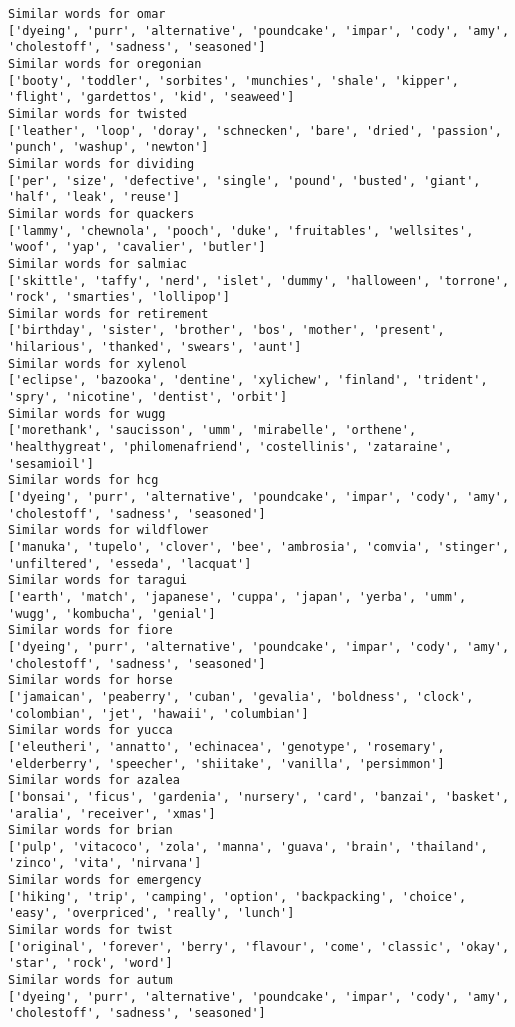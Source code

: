 \documentclass[11pt]{article}
\begin{document}
\begin{Verbatim}[commandchars=\\\{\}]
Similar words for omar
['dyeing', 'purr', 'alternative', 'poundcake', 'impar', 'cody', 'amy', 'cholestoff', 'sadness', 'seasoned']
Similar words for oregonian
['booty', 'toddler', 'sorbites', 'munchies', 'shale', 'kipper', 'flight', 'gardettos', 'kid', 'seaweed']
Similar words for twisted
['leather', 'loop', 'doray', 'schnecken', 'bare', 'dried', 'passion', 'punch', 'washup', 'newton']
Similar words for dividing
['per', 'size', 'defective', 'single', 'pound', 'busted', 'giant', 'half', 'leak', 'reuse']
Similar words for quackers
['lammy', 'chewnola', 'pooch', 'duke', 'fruitables', 'wellsites', 'woof', 'yap', 'cavalier', 'butler']
Similar words for salmiac
['skittle', 'taffy', 'nerd', 'islet', 'dummy', 'halloween', 'torrone', 'rock', 'smarties', 'lollipop']
Similar words for retirement
['birthday', 'sister', 'brother', 'bos', 'mother', 'present', 'hilarious', 'thanked', 'swears', 'aunt']
Similar words for xylenol
['eclipse', 'bazooka', 'dentine', 'xylichew', 'finland', 'trident', 'spry', 'nicotine', 'dentist', 'orbit']
Similar words for wugg
['morethank', 'saucisson', 'umm', 'mirabelle', 'orthene', 'healthygreat', 'philomenafriend', 'costellinis', 'zataraine', 'sesamioil']
Similar words for hcg
['dyeing', 'purr', 'alternative', 'poundcake', 'impar', 'cody', 'amy', 'cholestoff', 'sadness', 'seasoned']
Similar words for wildflower
['manuka', 'tupelo', 'clover', 'bee', 'ambrosia', 'comvia', 'stinger', 'unfiltered', 'esseda', 'lacquat']
Similar words for taragui
['earth', 'match', 'japanese', 'cuppa', 'japan', 'yerba', 'umm', 'wugg', 'kombucha', 'genial']
Similar words for fiore
['dyeing', 'purr', 'alternative', 'poundcake', 'impar', 'cody', 'amy', 'cholestoff', 'sadness', 'seasoned']
Similar words for horse
['jamaican', 'peaberry', 'cuban', 'gevalia', 'boldness', 'clock', 'colombian', 'jet', 'hawaii', 'columbian']
Similar words for yucca
['eleutheri', 'annatto', 'echinacea', 'genotype', 'rosemary', 'elderberry', 'speecher', 'shiitake', 'vanilla', 'persimmon']
Similar words for azalea
['bonsai', 'ficus', 'gardenia', 'nursery', 'card', 'banzai', 'basket', 'aralia', 'receiver', 'xmas']
Similar words for brian
['pulp', 'vitacoco', 'zola', 'manna', 'guava', 'brain', 'thailand', 'zinco', 'vita', 'nirvana']
Similar words for emergency
['hiking', 'trip', 'camping', 'option', 'backpacking', 'choice', 'easy', 'overpriced', 'really', 'lunch']
Similar words for twist
['original', 'forever', 'berry', 'flavour', 'come', 'classic', 'okay', 'star', 'rock', 'word']
Similar words for autum
['dyeing', 'purr', 'alternative', 'poundcake', 'impar', 'cody', 'amy', 'cholestoff', 'sadness', 'seasoned']

\end{Verbatim}
\end{document}
